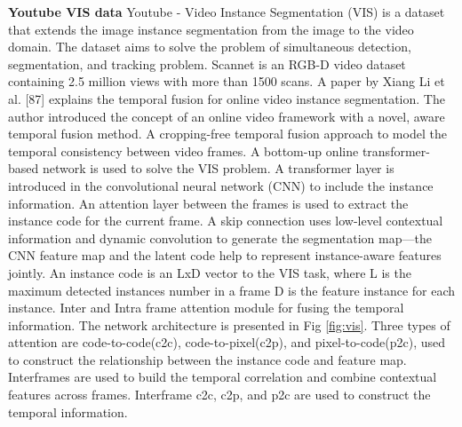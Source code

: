     { \bf Youtube VIS data}
    Youtube - Video Instance Segmentation (VIS) is a dataset that extends the image instance segmentation from the image to the video domain. The dataset aims to solve the problem of simultaneous detection, segmentation, and tracking problem. Scannet is an RGB-D video dataset containing 2.5 million views with more than 1500 scans. 
    A paper by Xiang Li et al. [87] explains the temporal fusion for online video instance segmentation. The author introduced the concept of an online video framework with a novel, aware temporal fusion method. A cropping-free temporal fusion approach to model the temporal consistency between video frames. A bottom-up online transformer-based network is used to solve the VIS problem. A transformer layer is introduced in the convolutional neural network (CNN) to include the instance information. An attention layer between the frames is used to extract the instance code for the current frame. A skip connection uses low-level contextual information and dynamic convolution to generate the segmentation map—the CNN feature map and the latent code help to represent instance-aware features jointly. An instance code is an LxD vector to the VIS task, where L is the maximum detected instances number in a frame D is the feature instance for each instance. Inter and Intra frame attention module for fusing the temporal information. The network architecture is presented in Fig \ref{fig:vis}. Three types of attention are code-to-code(c2c), code-to-pixel(c2p), and pixel-to-code(p2c), used to construct the	relationship between the instance code and feature map. Interframes are used to build the temporal correlation and combine contextual features across frames. Interframe c2c, c2p, and p2c are used to construct the temporal information.	
    
